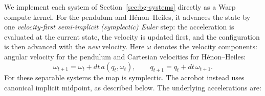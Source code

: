\documentclass[11pt]{article}
\begin{document}
We implement each system of Section~\ref{sec:bg-systems} directly as a Warp~\cite{macklin2022warp}
compute kernel. For the pendulum and Hénon--Heiles, it advances the state by one
\emph{velocity-first semi-implicit (symplectic) Euler} step:
the acceleration is evaluated at the current state, the velocity is updated first, and the
configuration is then advanced with the \emph{new} velocity. Here $\omega$ denotes the
velocity components: angular velocity for the pendulum and Cartesian velocities for
Hénon--Heiles:
\begin{equation}
\omega_{t+1} = \omega_t + dt\,a(q_t,\omega_t), \qquad
q_{t+1} = q_t + dt\,\omega_{t+1}.
\label{eq:semi-implicit}
\end{equation}
For these separable systems the map is symplectic. The acrobot instead uses canonical
implicit midpoint, as described below. The underlying accelerations are:
\end{document}
